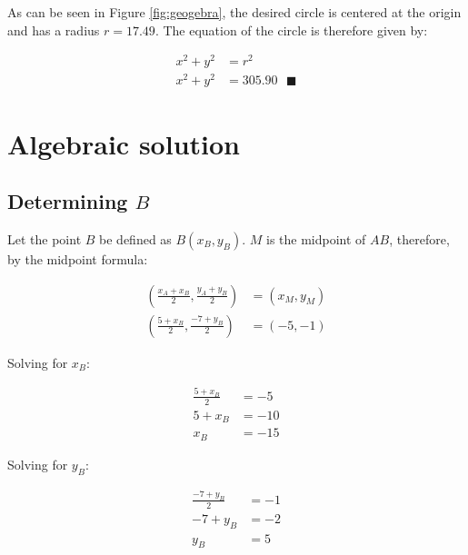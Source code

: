\documentclass[12pt]{article}
\begin{document}
As can be seen in Figure \ref{fig:geogebra}, the desired circle is centered at the origin and has a radius $r=17.49$. The equation of the circle is therefore given by:

\begin{align*}
x^2 + y^2 &= r^2\\
x^2 + y^2 &=305.90\text{ }\blacksquare
\end{align*}

\newpage

\section{Algebraic solution}

\subsection{Determining $B$}

Let the point $B$ be defined as $B(x_B, y_B)$. $M$ is the midpoint of $AB$, therefore, by the midpoint formula:

\begin{equation}
\begin{split}
\left(\frac{x_A + x_B}{2}, \frac{y_A+y_B}{2}\right) &= (x_M, y_M)\\
\left(\frac{5 + x_B}{2}, \frac{-7+y_B}{2}\right) &= (-5, -1)
\end{split}
\end{equation}

\begin{multicols}{2}

Solving for $x_B$:

\begin{equation}
\begin{split}
\frac{5+x_B}{2} &= -5\\
5 + x_B &= -10\\
x_B &= -15
\end{split}
\end{equation}

\columnbreak

Solving for $y_B$:

\begin{equation}
\begin{split}
\frac{-7+y_B}{2} &= -1\\
-7 + y_B &= -2\\
y_B &= 5
\end{split}
\end{equation}

\end{multicols}
\end{document}
